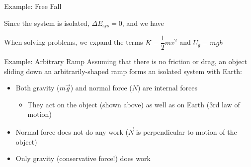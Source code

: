 \documentclass[12pt,compress,aspectratio=169]{beamer}
\begin{document}
\begin{frame}{Example: Free Fall}
  \begin{center}
  \end{center}
  Since the system is isolated, $\Delta E_\text{sys}=0$, and we have

  
  When solving problems, we expand the terms $K=\dfrac12mv^2$ and $U_g=mgh$
\end{frame}



\begin{frame}{Example: Arbitrary Ramp}{}
  {\color{orange}Assuming that there is no friction or drag}, an object
  sliding down an arbitrarily-shaped ramp forms an isolated system with Earth:
  \begin{center}
  \end{center}
  \begin{itemize}
  \item Both gravity ($m\vec g$) and normal force ($N$) are internal forces
    \begin{itemize}
    \item They act on the object (shown above) as well as on Earth (3rd law of
      motion)
    \end{itemize}
  \item Normal force does not do any work ($\vec N$ is perpendicular to motion
    of the object)
  \item Only gravity (conservative force!) does work
  \end{itemize}
\end{frame}
\end{document}
